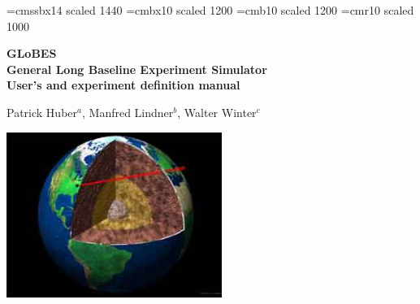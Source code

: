 \documentclass[a4paper,12pt,twoside]{book}
\newcommand{\GLOBES}{{\sf GLoBES}}
\begin{document}
 

\frontmatter
{}
\thispagestyle{empty}
{
\setlength{\parindent}{0cm}


\font\fa=cmssbx14 scaled 1440
\font\fb=cmbx10 scaled 1200
\font\fc=cmb10 scaled 1200
\font\fd=cmr10 scaled 1000  

{\setlength{\baselineskip}{1.2cm}}

\vspace*{1.5cm}

\begin{center}
{ \Large \bf
{\Huge \GLOBES} \\
General Long Baseline Experiment Simulator \\ }
\vspace*{0.5cm}
{\large \bf User's and experiment definition manual }

\end{center}

\vspace{0.5cm}

\begin{center}
{\large Patrick Huber$^a$, Manfred Lindner$^b$, Walter Winter$^c$}
\end{center}

\vspace{0.3cm}

\begin{center}





\end{center}

\vspace{1cm}

\begin{center}
\colorbox{black}{\includegraphics[width=7cm]{.save/earthint}}


\end{center}}
\end{document}
